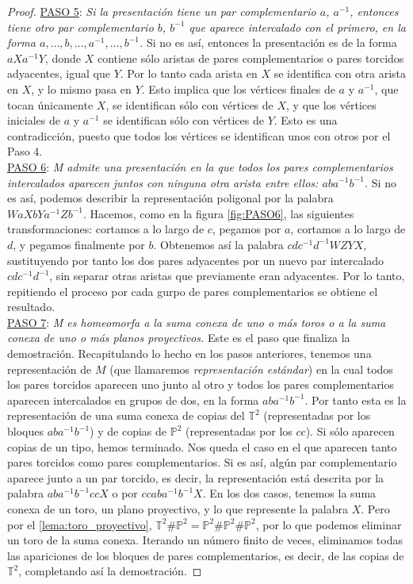 \documentclass[10pt]{report}
\newcommand{\Toro}{\mathbb{T}^2}
\newcommand{\Proyectivo}{\mathbb{P}^2}
\theoremstyle{definition}
\begin{document}
\begin{proof}
\underline{PASO 5}: \textit{Si la presentación tiene un par complementario $a$, $a^{-1}$, entonces tiene otro par complementario $b$,  $b^{-1}$ que aparece intercalado con el primero, en la forma $a,\dots , b, \dots ,a^{-1}, \dots , b^{-1} $.} Si no es así, entonces la presentación es de la forma $aXa^{-1}Y$, donde $X$ contiene sólo aristas de pares complementarios o pares torcidos adyacentes, igual que $Y$. Por lo tanto cada arista en $X$ se identifica con otra arista en $X$, y lo mismo pasa en $Y$. Esto implica que los vértices finales de $a$ y $a^{-1}$, que tocan únicamente $X$, se identifican sólo con vértices de $X$, y que los vértices iniciales de $a$ y $a^{-1}$ se identifican sólo con vértices de $Y$. Esto es una contradicción, puesto que todos los vértices se identifican unos con otros por el Paso 4.\\

\underline{PASO 6}: \textit{M admite una presentación en la que todos los pares complementarios intercalados aparecen juntos con ninguna otra arista entre ellos: $aba^{-1}b^{-1}$.} Si no es así, podemos describir la representación poligonal por la palabra $WaXbYa^{-1}Zb^{-1}$. Hacemos, como en la figura \autoref{fig:PASO6}, las siguientes transformaciones: cortamos a lo largo de $c$, pegamos por $a$, cortamos a lo largo de $d$, y pegamos finalmente por $b$. Obtenemos así la palabra $cdc^{-1}d^{-1}WZYX$, sustituyendo por tanto los dos pares adyacentes por un nuevo par intercalado $cdc^{-1}d^{-1}$, sin separar otras aristas que previamente eran adyacentes. Por lo tanto, repitiendo el proceso por cada gurpo de pares complementarios se obtiene el resultado.\\

\underline{PASO 7}: \textit{M es homeomorfa a la suma conexa de uno o más toros o a la suma conexa de uno o más planos proyectivos.} Este es el paso que finaliza la demostración.  Recapitulando lo hecho en los pasos anteriores, tenemos una representación de $M$ (que llamaremos \textit{representación estándar}) en la cual todos los pares torcidos aparecen uno junto al otro y todos los pares complementarios aparecen intercalados en grupos de dos, en la forma $aba^{-1}b^{-1}$. Por tanto esta es la representación de una suma conexa de copias del $\Toro$ (representadas por los bloques $aba^{-1}b^{-1}$) y de copias de $\Proyectivo$ (representadas por los $cc$). Si sólo aparecen copias de un tipo, hemos terminado.
Nos queda el caso en el que aparecen tanto pares torcidos como pares complementarios. Si es así, algún par complementario aparece junto a un par torcido, es decir, la representación está descrita por la palabra $aba^{-1}b^{-1}ccX$ o por $ccaba^{-1}b^{-1}X$. En los dos casos, tenemos la suma conexa de un toro, un plano proyectivo, y lo que represente la palabra $X$. Pero por el \autoref{lema:toro_proyectivo}, $\Toro \# \Proyectivo = \Proyectivo \# \Proyectivo \# \Proyectivo$, por lo que podemos eliminar un toro de la suma conexa. Iterando un número finito de veces, eliminamos todas las apariciones de los bloques de pares complementarios, es decir, de las copias de $\Toro$, completando así la demostración.
\end{proof}
\end{document}
